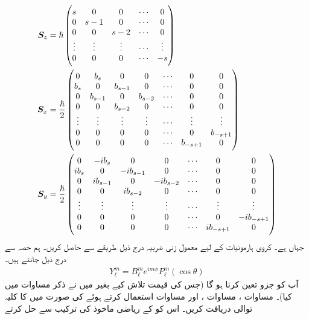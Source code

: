 \begin{align*}
 {\ensuremath{{\boldsymbol{S}}}}_z&=\hslash \begin{pmatrix}
 s&0&0&\cdots&0\\0&s-1&0&\cdots&0\\0&0&s-2&\cdots&0\\\vdots&\vdots&\vdots&\cdots&\vdots\\0&0&0&\cdots&-s
 \end{pmatrix} \\ 
 {{\boldsymbol{S}}}_x&=\frac{\hslash}{2}\begin{pmatrix}0&b_s&0&0&\cdots&0&0\\b_s&0&b_{s-1}&0&\cdots&0&0\\0&b_{s-1}&0&b_{s-2}&\cdots&0&0\\0&0&b_{s-2}&0&\cdots&0&0\\\vdots&\vdots&\vdots&\vdots&\cdots&\vdots&\vdots\\0&0&0&0&\cdots&0&b_{-s+1}\\0&0&0&0&\cdots&b_{-s+1}&0\end{pmatrix} \\
 {{\boldsymbol{S}}}_y&=\frac{\hslash}{2}\begin{pmatrix}0&-i b_s&0&0&\cdots&0&0\\i b_s&0&-i b_{s-1}&0&\cdots&0&0\\0&i b_{s-1}&0&-i b_{s-2}&\cdots&0&0\\0&0&i b_{s-2}&0&\cdots&0&0\\\vdots&\vdots&\vdots&\vdots&\cdots&\vdots&\vdots\\0&0&0&0&\cdots&0&-i b_{-s+1}\\0&0&0&0&\cdots&i b_{-s+1}&0
 \end{pmatrix}
\end{align*} 
جہاں  ہے۔
کروی ہارمونیات کے لیے معمول زنی ضربیہ درج ذیل طریقے سے حاصل کریں۔ ہم حصہ سے درج ذیل جانتے ہیں۔
\begin{align*} 
 Y_{\ell}^{m}=B_{\ell}^{m}e^{i m\phi}P_{\ell} ^{m}(\cos\theta)
\end{align*} 
آپ کو جزو  تعین کرنا ہو گا (جس کی قیمت تلاش کیے بغیر میں نے ذکر مساوات  میں کیا)۔ مساوات ، مساوات ، اور مساوات  استعمال کرتے ہوئے  کی صورت میں  کا کلیہ توالی دریافت کریں۔ اس کو  کے ریاضی ماخوذ کی ترکیب سے حل کرتے
